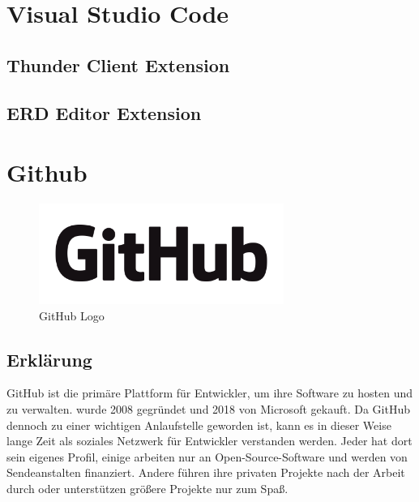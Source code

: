 \section{Visual Studio Code}
\author{unknown}
\lipsum[10-15]

\subsection{Thunder Client Extension}
\author{Stefano Pyringer}
\lipsum[5-10]

\subsection{ERD Editor Extension}
\author{Stefano Pyringer}
\lipsum[5-10]
\newpage

\section{Github}
\author{Mirzet Sakonjic}
\cite{GitHub}
\begin{figure}[h]
    \begin{center}
        \includegraphics*[width=8cm]{pics/GitHub_Logo.png}
        \caption[GitHub Logo]{GitHub Logo \cite{GithubLogo}}
    \end{center}
\end{figure}
\subsection*{Erklärung}
GitHub ist die primäre Plattform für Entwickler, um ihre Software zu hosten 
und zu verwalten. wurde 2008 gegründet und 2018 von Microsoft gekauft. 
Da GitHub dennoch zu einer wichtigen Anlaufstelle geworden ist, 
kann es in dieser Weise lange Zeit als soziales Netzwerk für Entwickler 
verstanden werden. Jeder hat dort sein eigenes Profil, einige arbeiten 
nur an Open-Source-Software und werden von Sendeanstalten finanziert. 
Andere führen ihre privaten Projekte nach der Arbeit durch oder unterstützen 
größere Projekte nur zum Spaß.
